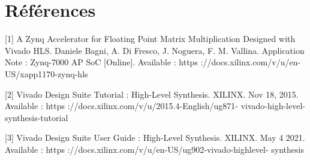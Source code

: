\documentclass[../CSC_5RO06_TA.tex]{subfiles}
\begin{document}
\section*{Références}

[1] A Zynq Accelerator for Floating Point Matrix Multiplication Designed
with Vivado HLS. Daniele Bagni, A. Di Fresco, J. Noguera, F. M.
Vallina. Application Note : Zynq-7000 AP SoC [Online]. Available :
https ://docs.xilinx.com/v/u/en-US/xapp1170-zynq-hls


[2] Vivado Design Suite Tutorial : High-Level Synthesis. XILINX. Nov
18, 2015. Available : https ://docs.xilinx.com/v/u/2015.4-English/ug871-
vivado-high-level-synthesis-tutorial


[3] Vivado Design Suite User Guide : High-Level Synthesis. XILINX. May 4
2021. Available : https ://docs.xilinx.com/v/u/en-US/ug902-vivado-highlevel-
synthesis
\end{document}
